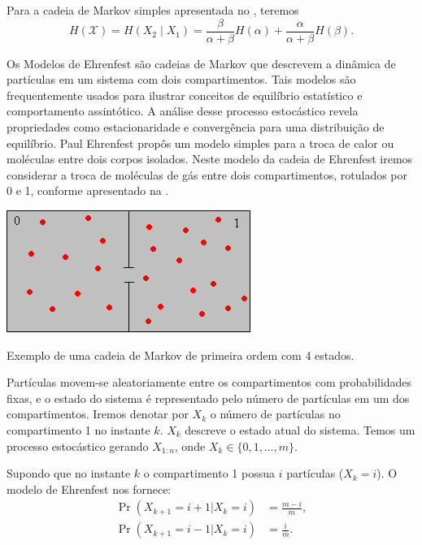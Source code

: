 \begin{example}
  Para a cadeia de Markov simples apresentada no , teremos
  \begin{equation}
    H(\mathcal{X}) = H(X_2 \mid X_1) = \frac{\beta}{\alpha + \beta} H(\alpha) + \frac{\alpha}{\alpha + \beta} H(\beta) .
  \end{equation}
\end{example}


\begin{example}
Os Modelos de Ehrenfest são cadeias de Markov que descrevem a dinâmica de
partículas em um sistema com dois compartimentos. Tais modelos são
frequentemente usados para ilustrar conceitos de equilíbrio estatístico e
comportamento assintótico. A análise desse processo estocástico revela
propriedades como estacionaridade e convergência para uma distribuição de
equilíbrio. Paul Ehrenfest propôs um modelo simples para a troca de calor ou
moléculas entre dois corpos isolados. Neste modelo da cadeia de Ehrenfest
iremos considerar a troca de moléculas de gás entre dois compartimentos,
rotulados por 0 e 1, conforme apresentado na .
\begin{marginfigure}%
  \includegraphics[width=\linewidth]{figures/ehrenfest.png}
  \caption{Exemplo de uma cadeia de Markov de primeira ordem com 4 estados.}
  \label{fig:ehrenfest}
\end{marginfigure}
Partículas movem-se aleatoriamente entre os
compartimentos com probabilidades fixas, e o estado do sistema é representado
pelo número de partículas em um dos compartimentos.
Iremos denotar por $X_k$ o número de partículas no compartimento 1 no instante $k$.
$X_k$ descreve o estado atual do sistema. Temos um processo estocástico gerando $X_{1:n}$,
onde $X_k \in \{0,1,\ldots,m\}$.

Supondo que no instante $k$ o compartimento 1 possua $i$ partículas ($X_k = i$).
O modelo de Ehrenfest nos fornece:
\begin{subequations}
\begin{align}
\Pr(X_{k+1} = i+1 | X_k = i) &= \frac{m - i}{m} , \\
\Pr(X_{k+1} = i-1 | X_k = i) &= \frac{i}{m} .
\end{align}
\end{subequations}


\end{example}
